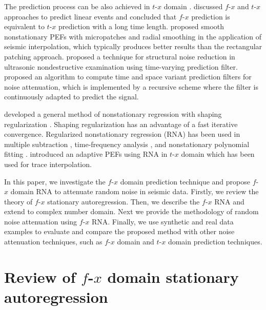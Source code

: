 The prediction process can be also achieved in $t$-$x$ domain 
\cite[]{Claerbout1992}. \cite{Abma1995} discussed $f$-$x$ 
and $t$-$x$ approaches to predict linear events and concluded 
that $f$-$x$ prediction is equivalent to $t$-$x$ prediction with a 
long time length. \cite{Crawley1999} proposed smooth 
nonstationary PEFs with micropatches and radial smoothing
in the application of seismic interpolation, which 
typically produces better results than the rectangular
patching approach. \cite{Izquierdo2006} proposed a 
technique for structural noise reduction in ultrasonic 
nondestructive examination using time-varying prediction 
filter. \cite{Sacchi2009} proposed an algorithm 
to compute time and space variant prediction filters for 
noise attenuation, which is implemented by a recursive 
scheme where the filter is continuously adapted to 
predict the signal.

\cite{Fomel2009} developed a general method of nonstationary 
regression with shaping regularization \cite[]{Fomel2007}. 
Shaping regularization has an advantage of a fast 
iterative convergence. Regularized nonstationary 
regression (RNA) has been used in multiple subtraction 
\cite{Fomel2009}, time-frequency analysis \cite[]{Liu2009}, 
and nonstationary polynomial fitting \cite[]{Liu2011}. 
\cite{Liu2010} introduced an adaptive PEFs using 
RNA in $t$-$x$ domain which has been used for trace interpolation. 

In this paper, we investigate the $f$-$x$ domain prediction 
technique and propose $f$-$x$ domain RNA to attenuate
random noise in seismic data. Firstly, we review 
the theory of $f$-$x$ stationary autoregression. Then, 
we describe the $f$-$x$ RNA and extend to complex number 
domain. Next we provide the methodology of random 
noise attenuation using $f$-$x$ RNA. Finally, we use 
synthetic and real data examples to evaluate and compare 
the proposed method with other noise attenuation techniques,
such as $f$-$x$ domain and $t$-$x$ domain prediction techniques.

\section{Review of $f$-$x$ domain stationary autoregression}

